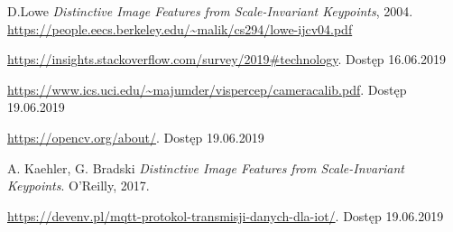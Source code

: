 \documentclass[12pt,twoside,polish]{article}
\begin{document}
\begin{thebibliography}{11}
D.Lowe \emph{Distinctive Image Features from Scale-Invariant Keypoints}, 2004.
\url{https://people.eecs.berkeley.edu/~malik/cs294/lowe-ijcv04.pdf}

\url{https://insights.stackoverflow.com/survey/2019\#technology}. Dostęp 16.06.2019

\url{https://www.ics.uci.edu/~majumder/vispercep/cameracalib.pdf}. Dostęp 19.06.2019

\url{https://opencv.org/about/}. Dostęp 19.06.2019

A. Kaehler, G. Bradski \emph{Distinctive Image Features from Scale-Invariant Keypoints}. O'Reilly, 2017.

\url{https://devenv.pl/mqtt-protokol-transmisji-danych-dla-iot/}. Dostęp 19.06.2019


\end{thebibliography}

\clearpage

\makesummary
\end{document}

